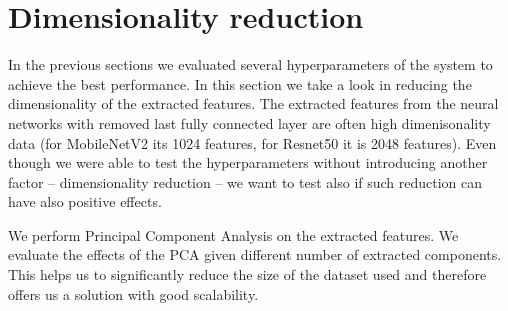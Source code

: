 \section{Dimensionality reduction}

In the previous sections we evaluated several hyperparameters of the system to achieve the best performance. In this section we take a look in reducing the dimensionality of the extracted features. The extracted features from the neural networks with removed last fully connected layer are often high dimenisonality data (for MobileNetV2 its 1024 features, for Resnet50 it is 2048 features). Even though we were able to test the hyperparameters without introducing another factor -- dimensionality reduction -- we want to test also if such reduction can have also positive effects.


We perform Principal Component Analysis on the extracted features. We evaluate the effects of the PCA given different number of extracted components. This helps us to significantly reduce the size of the dataset used and therefore offers us a solution with good scalability.

